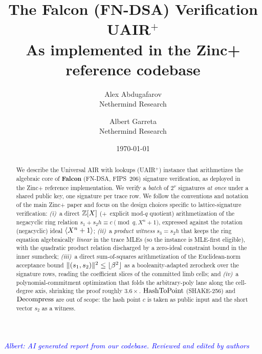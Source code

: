 \documentclass[11pt]{article}
\title{The Falcon (FN-DSA) Verification UAIR$^+$ \\
       \large As implemented in the Zinc+ reference codebase}
\author{Alex Abdugafarov \\[2pt] \normalsize Nethermind Research \and Albert Garreta \\[2pt] \normalsize Nethermind Research}
\date{\today}
\begin{document}
\maketitle

\begin{center}
\textcolor{blue}{\textit{Albert: AI generated report from our codebase. Reviewed and edited by authors}}
\end{center}
\vspace{0.5em}

\begin{abstract}
We describe the Universal AIR with lookups (UAIR$^+$) instance that
arithmetizes the algebraic core of \textbf{Falcon} (FN-DSA, FIPS~206)
signature verification, as deployed in the Zinc+ reference
implementation. We verify a \emph{batch} of $2^{\nu}$ signatures
\emph{at once} under a shared public key, one signature per trace row.
We follow the conventions and notation of the main Zinc+ paper and
focus on the design choices specific to lattice-signature verification:
\emph{(i)}~a direct $\mathbb{Z}[X]$ ($+$~explicit mod-$q$ quotient)
arithmetization of the negacyclic ring relation
$s_1 + s_2 h \equiv c \pmod{q, X^n+1}$, expressed against the rotation
(negacyclic) ideal $\langle X^{n}+1\rangle$; \emph{(ii)}~a \emph{product witness}
$s_3 = s_2 h$ that keeps the ring equation algebraically \emph{linear}
in the trace MLEs (so the instance is MLE-first eligible), with the
quadratic product relation discharged by a zero-ideal constraint bound
in the inner sumcheck; \emph{(iii)}~a direct sum-of-squares
arithmetization of the Euclidean-norm acceptance bound
$\lVert (s_1,s_2)\rVert^2 \le \lfloor \beta^2 \rfloor$ as a booleanity-adapted zerocheck
over the signature rows, reading the coefficient slices of the committed
limb cells; and \emph{(iv)}~a polynomial-commitment optimization that
folds the arbitrary-poly lane along the cell-degree axis, shrinking the
proof roughly $3.6\times$. $\operatorname{HashToPoint}$ (SHAKE-256) and $\operatorname{Decompress}$
are out of scope: the hash point $c$ is taken as public input and the
short vector $s_2$ as a witness.
\end{abstract}

\tableofcontents






\end{document}
